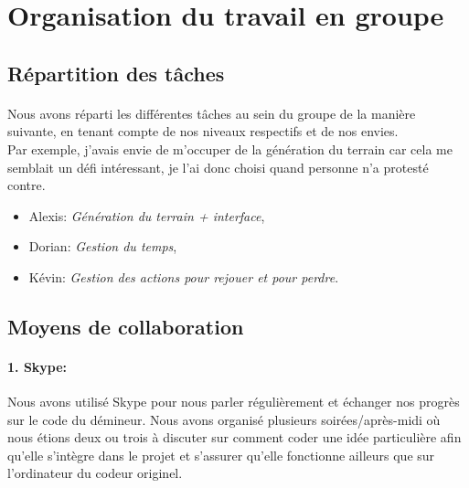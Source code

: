 \documentclass[12pt, a4paper]{article}
\begin{document}

\newpage

\section{Organisation du travail en groupe}

\subsection{Répartition des tâches}

\paragraph{}
Nous avons réparti les différentes tâches au sein du groupe de la manière
suivante, en tenant compte de nos niveaux respectifs et de nos envies. \\
Par exemple, j'avais envie de m'occuper de la génération du terrain car cela
me semblait un défi intéressant, je l'ai donc choisi quand personne n'a
protesté contre.

\begin{itemize}
\item Alexis: \emph{Génération du terrain + interface},
\item Dorian: \emph{Gestion du temps},
\item Kévin: \emph{Gestion des actions pour rejouer et pour perdre}.
\end{itemize}


\subsection{Moyens de collaboration}

\paragraph{1. Skype:}
Nous avons utilisé Skype pour nous parler régulièrement et échanger nos progrès
sur le code du démineur. Nous avons organisé plusieurs soirées/après-midi où
nous étions deux ou trois à discuter sur comment coder une idée particulière
afin qu'elle s'intègre dans le projet et s'assurer qu'elle fonctionne ailleurs
que sur l'ordinateur du codeur originel.
\end{document}
